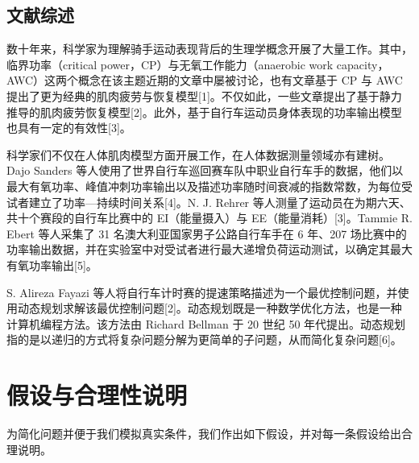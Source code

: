 \documentclass[11pt,a4paper]{ctexart}
\begin{document}
\subsection{文献综述}

数十年来，科学家为理解骑手运动表现背后的生理学概念开展了大量工作。其中，临界功率（critical power，CP）与无氧工作能力（anaerobic work capacity，AWC）这两个概念在该主题近期的文章中屡被讨论，也有文章基于 CP 与 AWC 提出了更为经典的肌肉疲劳与恢复模型[1]。不仅如此，一些文章提出了基于静力推导的肌肉疲劳恢复模型[2]。此外，基于自行车运动员身体表现的功率输出模型也具有一定的有效性[3]。

科学家们不仅在人体肌肉模型方面开展工作，在人体数据测量领域亦有建树。Dajo Sanders 等人使用了世界自行车巡回赛车队中职业自行车手的数据，他们以最大有氧功率、峰值冲刺功率输出以及描述功率随时间衰减的指数常数，为每位受试者建立了功率—持续时间关系[4]。N. J. Rehrer 等人测量了运动员在为期六天、共十个赛段的自行车比赛中的 EI（能量摄入）与 EE（能量消耗）[3]。Tammie R. Ebert 等人采集了 31 名澳大利亚国家男子公路自行车手在 6 年、207 场比赛中的功率输出数据，并在实验室中对受试者进行最大递增负荷运动测试，以确定其最大有氧功率输出[5]。

S. Alireza Fayazi 等人将自行车计时赛的提速策略描述为一个最优控制问题，并使用动态规划求解该最优控制问题[2]。动态规划既是一种数学优化方法，也是一种计算机编程方法。该方法由 Richard Bellman 于 20 世纪 50 年代提出。动态规划指的是以递归的方式将复杂问题分解为更简单的子问题，从而简化复杂问题[6]。

\section{假设与合理性说明}

为简化问题并便于我们模拟真实条件，我们作出如下假设，并对每一条假设给出合理说明。
\end{document}
